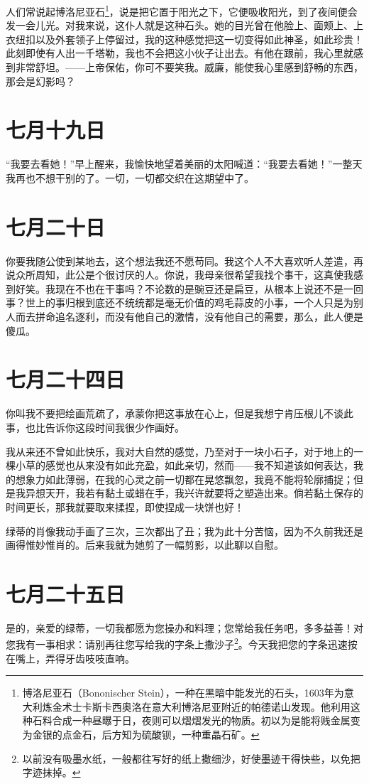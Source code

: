 \documentclass[12pt,oneside]{book}
\begin{document}
人们常说起博洛尼亚石\footnote{博洛尼亚石（Bononischer Stein），一种在黑暗中能发光的石头，1603年为意大利炼金术士卡斯卡西奥洛在意大利博洛尼亚附近的帕德诺山发现。他利用这种石料合成一种昼曝于日，夜则可以熠熠发光的物质。初以为是能将贱金属变为金银的点金石，后方知为硫酸钡，一种重晶石矿。}，说是把它置于阳光之下，它便吸收阳光，到了夜间便会发一会儿光。对我来说，这仆人就是这种石头。她的目光曾在他脸上、面颊上、上衣纽扣以及外套领子上停留过，我的这种感觉把这一切变得如此神圣，如此珍贵！此刻即使有人出一千塔勒，我也不会把这小伙子让出去。有他在跟前，我心里就感到非常舒坦。——上帝保佑，你可不要笑我。威廉，能使我心里感到舒畅的东西，那会是幻影吗？
　　
\chapter{七月十九日}
“我要去看她！”早上醒来，我愉快地望着美丽的太阳喊道：“我要去看她！”一整天我再也不想干别的了。一切，一切都交织在这期望中了。
　　
\chapter{七月二十日}
你要我随公使到某地去，这个想法我还不愿苟同。我这个人不大喜欢听人差遣，再说众所周知，此公是个很讨厌的人。你说，我母亲很希望我找个事干，这真使我感到好笑。我现在不也在干事吗？不论数的是豌豆还是扁豆，从根本上说还不是一回事？世上的事归根到底还不统统都是毫无价值的鸡毛蒜皮的小事，一个人只是为别人而去拼命追名逐利，而没有他自己的激情，没有他自己的需要，那么，此人便是傻瓜。
　　

\chapter{七月二十四日}
你叫我不要把绘画荒疏了，承蒙你把这事放在心上，但是我想宁肯压根儿不谈此事，也比告诉你这段时间我很少作画好。

我从来还不曾如此快乐，我对大自然的感觉，乃至对于一块小石子，对于地上的一棵小草的感觉也从来没有如此充盈，如此亲切，然而——我不知道该如何表达，我的想象力如此薄弱，在我的心灵之前一切都在晃悠飘忽，我竟不能将轮廓捕捉；但是我异想天开，我若有黏土或蜡在手，我兴许就要将之塑造出来。倘若黏土保存的时间更长，那我就要取来揉捏，即使捏成一块饼也好！

绿蒂的肖像我动手画了三次，三次都出了丑；我为此十分苦恼，因为不久前我还是画得惟妙惟肖的。后来我就为她剪了一幅剪影，以此聊以自慰。
　　

\chapter{七月二十五日}
是的，亲爱的绿蒂，一切我都愿为您操办和料理；您常给我任务吧，多多益善！对您我有一事相求：请别再往您写给我的字条上撒沙子\footnote{以前没有吸墨水纸，一般都往写好的纸上撒细沙，好使墨迹干得快些，以免把字迹抹掉。}。今天我把您的字条迅速按在嘴上，弄得牙齿吱吱直响。
　　
\end{document}

